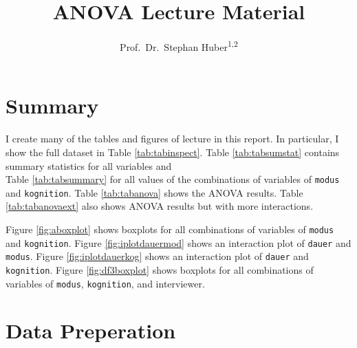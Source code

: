 \documentclass[
  doc,floatsintext]{apa6}
\title{ANOVA Lecture Material}
\author{Prof.~Dr.~Stephan Huber\textsuperscript{1,2}}
\date{}
\affiliation{\vspace{0.5cm}\textsuperscript{1} Fresenius University of Applied Science\\\textsuperscript{2} Charlotte Fresenius University}
\begin{document}
\maketitle

{
\setcounter{tocdepth}{3}
\tableofcontents
}
\hypertarget{summary}{%
\section{Summary}\label{summary}}

I create many of the tables and figures of lecture in this report. In particular, I show the full dataset in
Table \ref{tab:tabinspect}.
Table \ref{tab:tabsumstat} contains summary statistics for all variables and\\
Table \ref{tab:tabsummary} for all values of the combinations of variables of \texttt{modus} and \texttt{kognition}.
Table \ref{tab:tabanova} shows the ANOVA results.
Table \ref{tab:tabanovaext} also shows ANOVA results but with more interactions.

Figure \ref{fig:aboxplot} shows boxplots for all combinations of variables of \texttt{modus} and \texttt{kognition}.
Figure \ref{fig:iplotdauermod} shows an interaction plot of \texttt{dauer} and \texttt{modus}.
Figure \ref{fig:iplotdauerkog} shows an interaction plot of \texttt{dauer} and \texttt{kognition}.
Figure \ref{fig:df3boxplot} shows boxplots for all combinations of variables of \texttt{modus}, \texttt{kognition}, and interviewer.

\hypertarget{data-preperation}{%
\section{Data Preperation}\label{data-preperation}}
\end{document}

